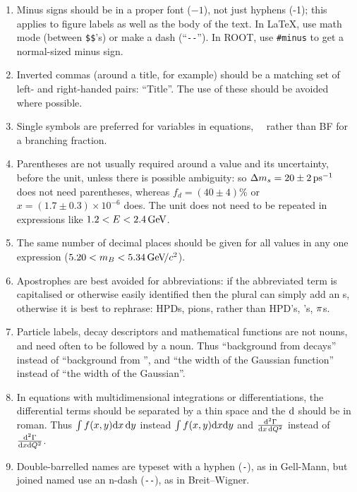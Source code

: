 \begin{enumerate}
\item Minus signs should be in a proper font ($-1$), not just hyphens
  (-1); this applies to figure labels as well as the body of the text.
  In \LaTeX, use math mode (between \verb!$$!'s) or make a dash (``\verb!--!'').
  In ROOT, use \verb!#minus! to get a normal-sized minus sign. 

\item Inverted commas (around a title, for example) should be a
  matching set of left- and right-handed pairs: ``Title''. The use of
  these should be avoided where possible.

\item Single symbols are preferred for variables in equations, \eg\
  \BF\ rather than BF for a branching fraction.

\item Parentheses are not usually required around a value and its
  uncertainty, before the unit, unless there is possible ambiguity: so
  \mbox{${\Delta m_{{s}}} = 20 \pm 2\text{\,ps}^{-1}$} does not need parentheses,
  whereas \mbox{$f_d = (40 \pm 4)$\%} or \mbox{$x=(1.7\pm0.3)\times 10^{-6}$} does.
  The unit does not need to be repeated in
  expressions like \mbox{$1.2 < E < 2.4\text{\,Ge\kern -0.1em V}$}.

\item The same number of decimal places should be given for all values
  in any one expression (\eg \mbox{$5.20 < m_B < 5.34\text{\,Ge\kern -0.1em V\!/}c^2$}).

\item Apostrophes are best avoided for abbreviations: if the abbreviated term
  is capitalised or otherwise easily identified then the plural can simply add
  an s, otherwise it is best to rephrase: \eg HPDs, pions, rather
  than HPD's, \piz's, ${\pi}$s.

\item Particle labels, decay descriptors and mathematical functions are not nouns, and need often to be followed by a noun. 
Thus ``background from \decay{\Bd}{\pip\pim} decays'' instead of ``background from \decay{\Bd}{\pip\pim}'',
and ``the width of the Gaussian function'' instead of ``the width of the Gaussian''.

\item In equations with multidimensional integrations or differentiations, the differential terms should be separated by a thin space and the $\rm d$ should be in roman.
Thus $\int f(x,y) {\rm d}x\,{\rm d}y$ instead $\int f(x,y) {\rm d}x{\rm d}y$ and
$\frac{{\rm d}^2\Gamma}{{\rm d}x\,{\rm d}Q^2}$ instead of $\frac{{\rm d}^2\Gamma}{{\rm d}x{\rm d}Q^2}$.

\item Double-barrelled names are typeset with a hyphen (\verb!-!), as in Gell-Mann, but joined named use an n-dash (\verb!--!), as in Breit--Wigner. 


\end{enumerate}
